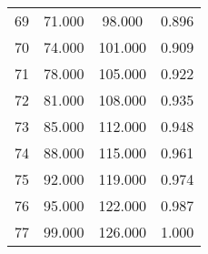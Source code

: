 \begin{tabular}{cccc}
  69 & 71.000 & 98.000 & 0.896 \\ 
  70 & 74.000 & 101.000 & 0.909 \\ 
  71 & 78.000 & 105.000 & 0.922 \\ 
  72 & 81.000 & 108.000 & 0.935 \\ 
  73 & 85.000 & 112.000 & 0.948 \\ 
  74 & 88.000 & 115.000 & 0.961 \\ 
  75 & 92.000 & 119.000 & 0.974 \\ 
  76 & 95.000 & 122.000 & 0.987 \\ 
  77 & 99.000 & 126.000 & 1.000 \\ 
   \hline
\end{tabular}
